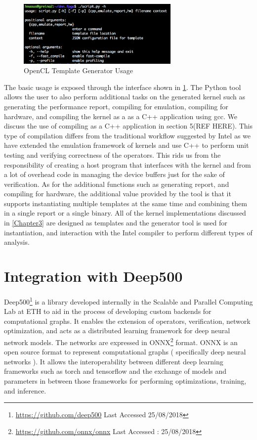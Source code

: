 \begin{figure}[h!]
\centering
\includegraphics[width=0.7\textwidth]{Figures/usage}
\decoRule
\caption[Tempate Generator Usage]{ OpenCL Template Generator Usage }
\label{fig:usage}
\end{figure}

The basic usage is exposed through the interface shown in \ref{fig:usage}. The Python tool allows the user to also perform additional tasks on the generated kernel such as generating the performance report, compiling for emulation, compiling for hardware, and compiling the kernel as a as a C++ application using gcc. We discuss the use of compiling   as a C++ application in section 5(REF HERE). This type of compilation differs from the traditional workflow suggested by Intel as we have extended the emulation framework of kernels and use C++ to perform unit testing and verifying correctness of the operators. This rids us from the responsibility of creating a host program that interfaces with the kernel and from a lot of overhead code in managing the device buffers just for the sake of verification. 
As for the additional functions such as generating report, and compiling for hardware, the additional value provided by the tool is that it supports instantiating multiple templates at the same time and combining them in a single report or a single binary. All of the kernel implementations discussed in \ref{Chapter3} are designed as templates and the generator tool is used for instantiation, and interaction with the Intel compiler to perform different types of analysis.

\section{Integration with Deep500}

Deep500\footnote{\url{https://github.com/deep500} Last Accessed 25/08/2018} is a library developed internally in the Scalable and Parallel Computing Lab at ETH to aid in the process of developing custom backends for computational graphs. It enables the extension of operators, verification, network optimization, and acts as a distributed learning framework for deep neural network models. The networks are expressed in ONNX\footnote{\url{https://github.com/onnx/onnx} Last Accessed : 25/08/2018 } format. ONNX is an open source format to represent computational graphs ( specifically deep neural networks ). It allows the interoperability between different deep learning frameworks such as torch\cite{torch} and tensorflow\cite{tensorflow} and the exchange of models and parameters in between those frameworks for performing optimizations, training, and inference. 

